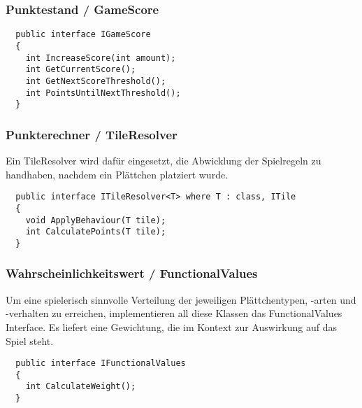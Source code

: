\documentclass[../main.tex]{subfiles}
\begin{document}
	\subsubsection{Punktestand / GameScore}
	\begin{lstlisting}
  public interface IGameScore
  {
	int IncreaseScore(int amount);
	int GetCurrentScore();
	int GetNextScoreThreshold();
	int PointsUntilNextThreshold();
  }
	\end{lstlisting}

	\subsubsection{Punkterechner / TileResolver}
	\par Ein TileResolver wird dafür eingesetzt, die Abwicklung der Spielregeln zu handhaben, nachdem ein Plättchen platziert wurde.
	\begin{lstlisting}
  public interface ITileResolver<T> where T : class, ITile
  {
	void ApplyBehaviour(T tile);
	int CalculatePoints(T tile);
  }
	\end{lstlisting}

	\subsubsection{Wahrscheinlichkeitswert / FunctionalValues}
	\par Um eine spielerisch sinnvolle Verteilung der jeweiligen Plättchentypen, -arten und -verhalten zu erreichen, implementieren all diese Klassen das FunctionalValues Interface. Es liefert eine Gewichtung, die im Kontext zur Auswirkung auf das Spiel steht.
	\begin{lstlisting}
  public interface IFunctionalValues
  {
	int CalculateWeight();
  }
	\end{lstlisting}
\end{document}
